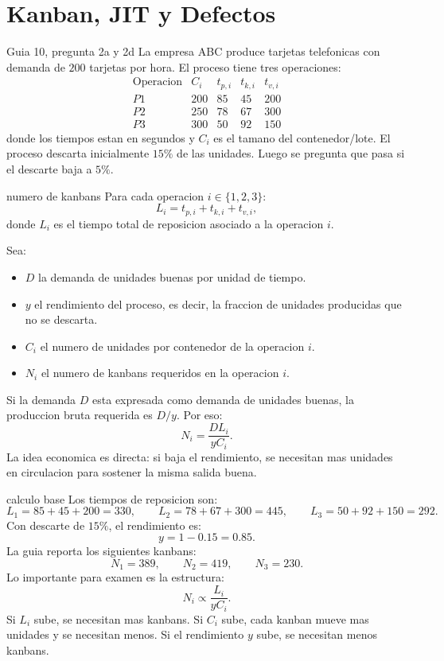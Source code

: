 \section{Kanban, JIT y Defectos}

\begin{ejercicio}{Guia 10, pregunta 2a y 2d}
La empresa ABC produce tarjetas telefonicas con demanda de $200$ tarjetas por hora. El proceso tiene tres operaciones:
\[
\begin{array}{c|cccc}
\text{Operacion} & C_i & t_{p,i} & t_{k,i} & t_{v,i}\\
\hline
P1&200&85&45&200\\
P2&250&78&67&300\\
P3&300&50&92&150
\end{array}
\]
donde los tiempos estan en segundos y $C_i$ es el tamano del contenedor/lote. El proceso descarta inicialmente $15\%$ de las unidades. Luego se pregunta que pasa si el descarte baja a $5\%$.
\end{ejercicio}

\begin{materia}{numero de kanbans}
Para cada operacion $i\in\{1,2,3\}$:
\[
  L_i=t_{p,i}+t_{k,i}+t_{v,i},
\]
donde $L_i$ es el tiempo total de reposicion asociado a la operacion $i$.

Sea:
\begin{itemize}
  \item $D$ la demanda de unidades buenas por unidad de tiempo.
  \item $y$ el rendimiento del proceso, es decir, la fraccion de unidades producidas que no se descarta.
  \item $C_i$ el numero de unidades por contenedor de la operacion $i$.
  \item $N_i$ el numero de kanbans requeridos en la operacion $i$.
\end{itemize}
Si la demanda $D$ esta expresada como demanda de unidades buenas, la produccion bruta requerida es $D/y$. Por eso:
\[
  N_i=\frac{D L_i}{y C_i}.
\]
La idea economica es directa: si baja el rendimiento, se necesitan mas unidades en circulacion para sostener la misma salida buena.
\end{materia}

\begin{solucion}{calculo base}
Los tiempos de reposicion son:
\[
  L_1=85+45+200=330,\qquad
  L_2=78+67+300=445,\qquad
  L_3=50+92+150=292.
\]
Con descarte de $15\%$, el rendimiento es:
\[
  y=1-0.15=0.85.
\]
La guia reporta los siguientes kanbans:
\[
  N_1=389,\qquad N_2=419,\qquad N_3=230.
\]
Lo importante para examen es la estructura:
\[
  N_i \propto \frac{L_i}{yC_i}.
\]
Si $L_i$ sube, se necesitan mas kanbans. Si $C_i$ sube, cada kanban mueve mas unidades y se necesitan menos. Si el rendimiento $y$ sube, se necesitan menos kanbans.
\end{solucion}

